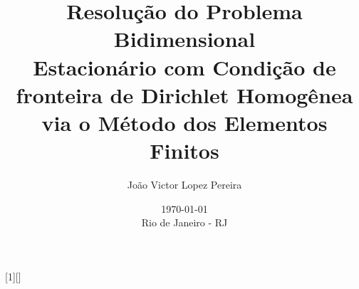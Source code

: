 \usepackage[brazil]{babel}                %
\usepackage[utf8]{inputenc}               %
\usepackage[T1]{fontenc}                  %

\usepackage{graphicx}                     %
\usepackage{float}                        %

\usepackage{tocloft}                      %
\usepackage{hyperref}                     %
\usepackage{csquotes}                     %
\usepackage[backend=biber]{biblatex}      %
\graphicspath{{figures/}}                 %

\usepackage{cancel}
\usepackage[top=1in, bottom=1in, left=0.5in, right=0.5in]{geometry}
\usepackage{amsmath, amssymb}             %
\usepackage{fancyvrb}                     %
\usepackage{upquote}                      %
\usepackage{indentfirst}                  %
\usepackage{listings}                     %
\setlength{\parskip}{\baselineskip}       %
\setlength{\footnotesep}{0.8em}           %
\setlength{\skip\footins}{2em}            %
\setlength{\cftbeforechapskip}{12pt}      %
\setlength{\cftbeforesecskip}{6pt}        %
\setlength{\jot}{10pt}

\title{
  Resolução do Problema Bidimensional \\
  Estacionário com Condição de \\
  fronteira de Dirichlet Homogênea \\
  via o Método dos Elementos Finitos
}

\date{
  \today\\
  \vfill
  Rio de Janeiro - RJ
}

\author{
  João Victor Lopez Pereira
}

[1][]{             %
  \lstset{
    basicstyle=\ttfamily,
    columns=flexible,                      %
    breaklines=true,
    breakatwhitespace=true,
    frame=none,
    basewidth=0.5em,                       %
    aboveskip=13pt,
    belowskip=0pt,
    #1
  }
}{}

